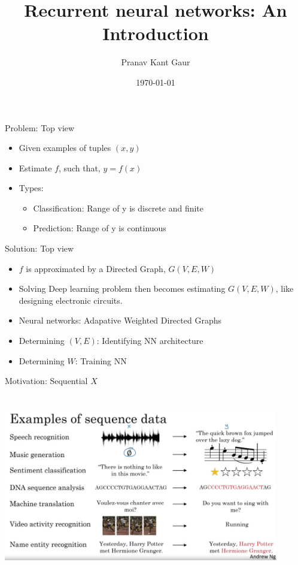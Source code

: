 \documentclass{beamer}
\title[RNNs]{Recurrent neural networks: An Introduction} %
\author{Pranav Kant Gaur} %
\institute[Computer Division] %
{
Graphics and Visualization Section\\ %
\medskip
}
\date{\today} %
\begin{document}
\begin{frame}
\titlepage %
\end{frame}

\begin{frame}{Problem: Top view}
    \begin{itemize}
        \item Given examples of tuples $(x,y)$
        \item Estimate $f$, such that, $y = f(x)$
        \item Types:
            \begin{itemize}
                \item Classification: Range of y is discrete and finite
                \item Prediction: Range of y is continuous
            \end{itemize}
    \end{itemize}
\end{frame}

\begin{frame}{Solution: Top view}
    \begin{itemize}
        \item $f$ is approximated by a Directed Graph, $G(V, E, W)$
        \item Solving Deep learning problem then becomes estimating $G(V, E, W)$, like designing electronic circuits.
        \item Neural networks: Adapative Weighted Directed Graphs
        \item Determining $(V, E)$: Identifying NN architecture
        \item Determining $W$: Training NN
    \end{itemize}
\end{frame}

\begin{frame}{Motivation: Sequential $X$}
    \begin{center}
        \includegraphics[width=12cm, height=8cm]{images/rnn_applications.png}    
    \end{center}
\end{frame}
\end{document}

